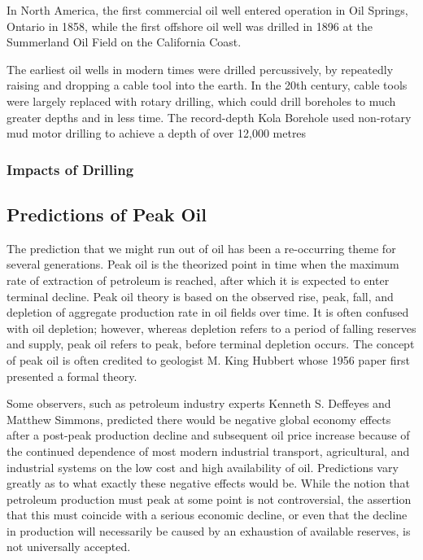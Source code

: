 In North America, the first commercial oil well entered operation in Oil Springs, Ontario in 1858, while the first offshore oil well was drilled in 1896 at the Summerland Oil Field on the California Coast.

The earliest oil wells in modern times were drilled percussively, by repeatedly raising and dropping a cable tool into the earth. In the 20th century, cable tools were largely replaced with rotary drilling, which could drill boreholes to much greater depths and in less time. The record-depth Kola Borehole used non-rotary mud motor drilling to achieve a depth of over 12,000 metres 

\subsubsection{Impacts of Drilling}


\subsection{Predictions of Peak Oil}

The prediction that we might run out of oil has been a re-occurring theme for several generations. Peak oil is the theorized point in time when the maximum rate of extraction of petroleum is reached, after which it is expected to enter terminal decline. Peak oil theory is based on the observed rise, peak, fall, and depletion of aggregate production rate in oil fields over time. It is often confused with oil depletion; however, whereas depletion refers to a period of falling reserves and supply, peak oil refers to peak, before terminal depletion occurs. The concept of peak oil is often credited to geologist M. King Hubbert whose 1956 paper first presented a formal theory.

Some observers, such as petroleum industry experts Kenneth S. Deffeyes and Matthew Simmons, predicted there would be negative global economy effects after a post-peak production decline and subsequent oil price increase because of the continued dependence of most modern industrial transport, agricultural, and industrial systems on the low cost and high availability of oil. Predictions vary greatly as to what exactly these negative effects would be. While the notion that petroleum production must peak at some point is not controversial, the assertion that this must coincide with a serious economic decline, or even that the decline in production will necessarily be caused by an exhaustion of available reserves, is not universally accepted.

